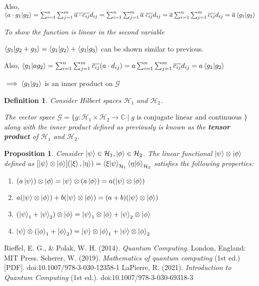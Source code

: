 \documentclass[12pt,twoside,fleqn]{report}
\makeatletter
\theoremstyle{thmstyle}
\renewenvironment{proof}[1][\proofname]{\par
\pushQED{\qed}%
\normalfont \topsep6\p@\@plus6\p@\relax
\trivlist
\item[\hskip\labelsep\itshape#1\@addpunct{.}]\mbox{}\par\nobreak\ignorespaces
}{%
    \popQED\endtrivlist\@endpefalse
    }
\newtheorem{defn}{Definition}[chapter]
\newtheorem{prop}{Proposition}[chapter]
\makeatother
\begin{document}
\begin{proof}
    Also, $\braket{a \cdot g_1 | g_2} = \sum_{i=1}^n \sum_{j=1}^m \overline{a \cdot c_{ij}} d_{ij} = \sum_{i=1}^n \sum_{j=1}^m \overline{a} \; \overline{c_{ij}} d_{ij} = \overline{a}  \sum_{i=1}^n \sum_{j=1}^m \overline{c_{ij}} d_{ij} = \overline{a} \braket{g_1|g_2}$

    \emph{To show the function is linear in the second variable}

    $\braket{g_1| g_2 + g_3} = \braket{g_1|g_2} + \braket{g_1|g_3}$ can be shown similar to previous.

    Also, $\braket{ g_1 | a g_2} = \sum_{i=1}^n \sum_{j=1}^m \overline{c_{ij}} (a \cdot d_{ij}) = a \sum_{i=1}^n \sum_{j=1}^m \overline{c_{ij}} d_{ij} = a \braket{g_1|g_2}$

    $\implies \braket{g_1|g_2}$ is an inner product on $\mathcal{G}$
\end{proof}

\begin{defn}
    Consider Hilbert spaces $\mathcal{H}_1$ and $\mathcal{H}_2$.

    The vector space $\mathcal{G} =  \{ g: \mathcal{H}_1 \times \mathcal{H}_2 \to \mathbb{C} \; | \; g \text{ is conjugate linear and continuous } \}$  along with the inner product defined as previously is known as the \textbf{tensor product} of $\mathcal{H}_1$ and $\mathcal{H}_2$.
\end{defn}


\begin{prop}
    Consider $\ket\psi \in \mathcal{H}_1, \ket\phi \in \mathcal{H}_2$.
    The linear functional $\ket{\psi} \otimes \ket{\phi}$ defined as $[\ket\psi \otimes \ket\phi](\ket\xi,\ket\eta) = \braket{\xi|\psi}_{\mathcal{H}_1}\braket{\eta|\phi}_{\mathcal{H}_2}$  satisfies the following properties:
    \begin{enumerate}
        \item $(a \ket\psi) \otimes \ket\phi = \ket\psi \otimes (a \ket\phi) = a (\ket\psi \otimes \ket\phi)$
        \item $a (\ket\psi \otimes \ket\phi) + b (\ket\psi \otimes \ket\phi) = (a + b) (\ket\psi \otimes \ket\phi)$
        \item $(\ket\psi_1 + \ket\psi_2) \otimes \ket\phi = \ket\psi_1 \otimes \ket\phi + \ket\psi_2 \otimes \ket\phi$
        \item $\ket\psi \otimes (\ket\phi_1 + \ket\phi_2) = \ket\psi \otimes \ket\phi_1 + \ket\psi \otimes \ket\phi_2$
    \end{enumerate}
\end{prop}

\newpage
{}
\begin{thebibliography}{9}
        Rieffel, E. G., \& Polak, W. H. (2014). \emph{Quantum Computing}. London, England: MIT Press.
        Scherer, W. (2019). \emph{Mathematics of quantum computing} (1st ed.) [PDF]. doi:10.1007/978-3-030-12358-1
        LaPierre, R. (2021). \emph{Introduction to Quantum Computing} (1st ed.). doi:10.1007/978-3-030-69318-3
\end{thebibliography}
\end{document}
